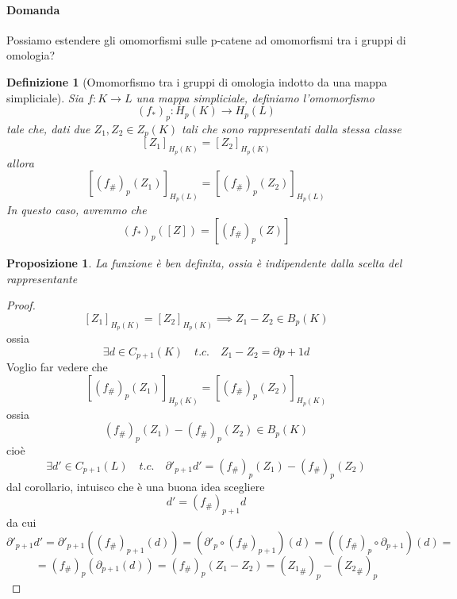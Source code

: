 \documentclass[a4paper]{report}
\newtheorem{proposition}{Proposizione}
\newtheorem{definition}{Definizione}
\newcommand{\ra}{\ensuremath{\rightarrow}}
\newcommand{\shrp}[1]{\ensuremath{({#1}_\#)_p}}
\newcommand{\str}[1]{\ensuremath{({#1}_*)_p}}
\begin{document}
\paragraph{Domanda} Possiamo estendere gli omomorfismi sulle p-catene ad omomorfismi tra i gruppi di omologia?
\begin{definition}[Omomorfismo tra i gruppi di omologia indotto da una mappa simpliciale]
    Sia $f:K\ra L$ una mappa simpliciale, definiamo l'omomorfismo
    \[
        \str{f}:H_p(K)\ra H_p(L)
    \]
    tale che, dati due $Z_1,Z_2\in Z_p(K)$ tali che sono rappresentati dalla stessa classe
    \[
        [Z_1]_{H_p(K)}=[Z_2]_{H_p(K)}
    \]
    allora
    \[
        [\shrp{f}(Z_1)]_{H_p(L)}=[\shrp{f}(Z_2)]_{H_p(L)}
    \]
    In questo caso, avremmo che
    \[
        \str{f}([Z])=[\shrp{f}(Z)]
    \]
\end{definition}
\begin{proposition}
    La funzione è ben definita, ossia è indipendente dalla scelta del rappresentante
\end{proposition}
\begin{proof}

    \[
        [Z_1]_{H_p(K)}=[Z_2]_{H_p(K)}\implies Z_1-Z_2\in B_p(K)
    \]
    ossia
    \[
        \exists d\in C_{p+1}(K)\quad t.c.\quad Z_1-Z_2=\partial{p+1}d
    \]
    Voglio far vedere che
    \[
        [\shrp{f}(Z_1)]_{H_p(K)}=[\shrp{f}(Z_2)]_{H_p(K)}
    \]
    ossia
    \[
        \shrp{f}(Z_1)-\shrp{f}(Z_2)\in B_p(K)
    \]
    cioè
    \[
        \exists d'\in C_{p+1}(L)\quad t.c.\quad \partial'_{p+1}d'=\shrp{f}(Z_1)-\shrp{f}(Z_2)
    \]
    dal corollario, intuisco che è una buona idea scegliere
    \[
        d'=(f_\#)_{p+1}d
    \]
    da cui
    \[
        \partial'_{p+1}d'=\partial'_{p+1}((f_\#)_{p+1}(d))=(\partial'_p\circ(f_\#)_{p+1})(d)=((f_\#)_p\circ\partial_{p+1})(d)=
    \]
    \[
        =\shrp{f}(\partial_{p+1}(d))=\shrp{f}(Z_1-Z_2)=\shrp{Z_1}-\shrp{Z_2}
    \]
\end{proof}
\end{document}
